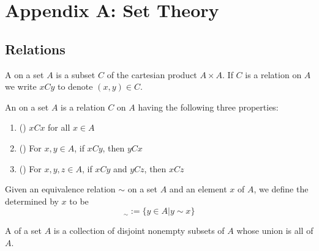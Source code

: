 %
%
%

\appendix
{}
\chapter{Appendix A: Set Theory}
\section{Relations}
    
    \begin{definition}[Relation]
        A  on a set $A$ is a subset $C$ of the cartesian product $A \times A$. If $C$ is a relation on $A$ we write $xCy$ to denote $(x,y) \in C$.
    \end{definition}
    

    \begin{definition}
        An  on a set $A$ is a relation $C$ on $A$ having the following three properties: \begin{enumerate}
            \item () $xCx$ for all $x \in A$
            \item () For $x,y \in A$, if $xCy$, then $yCx$
            \item () For $x,y,z \in A$, if $xCy$ and $yCz$, then $xCz$
        \end{enumerate}
    \end{definition}


    \begin{definition}
        Given an equivalence relation $\sim$ on a set $A$ and an element $x$ of $A$, we define the  determined by $x$ to be \begin{equation}
            [x]_{\sim} := \{y \in A\vert y\sim x\}
        \end{equation}
    \end{definition}


    \begin{definition}[Partition]
        A  of a set $A$ is a collection of disjoint nonempty subsets of $A$ whose union is all of $A$.
    \end{definition}



